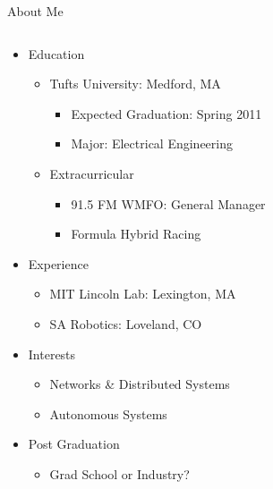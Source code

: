 \documentclass[xcolor=dvipsnames]{beamer}
\begin{document}
  \begin{frame}{About Me}
    \begin{columns}[T]
      \begin{column}{0.7\textwidth}
	\begin{itemize}
	\item Education
	  \begin{itemize}
	  \item Tufts University: Medford, MA
	    \begin{itemize}
	    \item Expected Graduation: Spring 2011
	    \item Major: Electrical Engineering
	    \end{itemize}
	  \item Extracurricular
	    \begin{itemize}
	    \item 91.5 FM WMFO: General Manager
	    \item Formula Hybrid Racing
	    \end{itemize}
	  \end{itemize}
	  \pause
	\item Experience
	  \begin{itemize}
	  \item MIT Lincoln Lab: Lexington, MA
	  \item SA Robotics: Loveland, CO
	  \end{itemize}
	  \pause
	\item Interests
	  \begin{itemize}
	  \item Networks \& Distributed Systems
	  \item Autonomous Systems
	  \end{itemize}
	  \pause
	\item Post Graduation
	  \begin{itemize}
	  \item Grad School or Industry?
	  \end{itemize}
	\end{itemize}
      \end{column}
      \begin{column}{0.3\textwidth}
	\vskip25pt
      \end{column}
    \end{columns}
  \end{frame}
  
\end{document}
